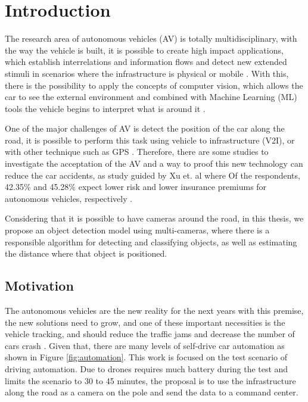 \chapter{Introduction} \label{introducao}
The research area of autonomous vehicles (AV) is totally multidisciplinary, with the way the vehicle is built, it is possible to create high impact applications, which establish interrelations and information flows and detect new extended stimuli in scenarios where the infrastructure is physical or mobile \cite{bayat2017environmental}. With this, there is the possibility to apply the concepts of computer vision, which allows the car to see the external environment and combined with Machine Learning (ML) tools the vehicle begins to interpret what is around it \cite{rasouli2019autonomous}.

One of the major challenges of AV is detect the position of the car along the road, it is possible to perform this task using vehicle to infrastructure (V2I), or with other technique such as GPS \cite{hobert2015enhancements}. Therefore, there are some studies to investigate the acceptation of the AV and a way to proof this new technology can reduce the car accidents, as study guided by Xu et. al where Of the respondents, 42.35\% and 45.28\% expect lower risk and lower insurance premiums for autonomous vehicles, respectively \cite{xu2019autonomous}.

Considering that it is possible to have cameras around the road, in this thesis, we propose an object detection model using multi-cameras, where there is a responsible algorithm for detecting and classifying objects, as well as estimating the distance where that object is positioned.

\section{Motivation}

The autonomous vehicles are the new reality for the next years with this premise, the new solutions need to grow, and one of these important necessities is the vehicle tracking, and should reduce the traffic jams and decrease the number of cars crash \cite{bonnefon2016social}. Given that, there are many levels of self-drive car automation as shown in Figure \ref{fig:automation}. This work is focused on the test scenario of driving automation. Due to drones requires much battery during the test and limits the scenario to 30 to 45 minutes, the proposal is to use the infrastructure along the road as a camera on the pole and send the data to a command center.

